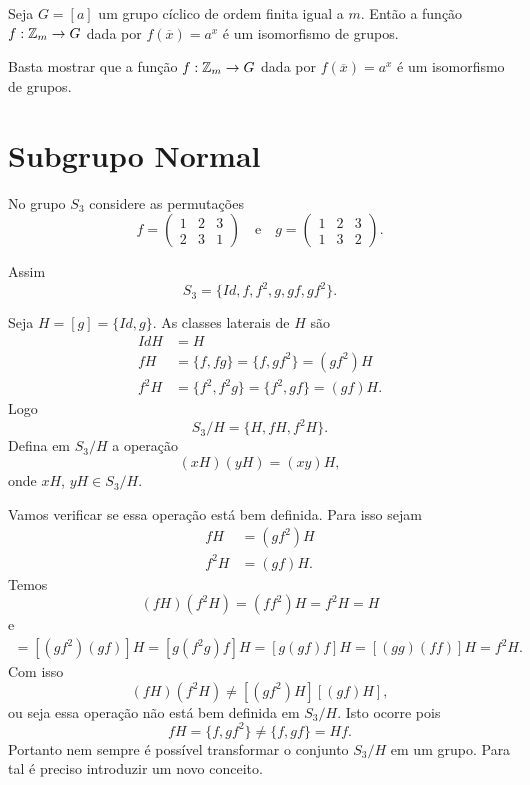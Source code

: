 \begin{corolario}
    Seja $G = [a]$ um grupo cíclico de ordem finita igual a $m$. Então a função $f : \mathbb{Z}_m \to G$ dada por $f(\overline{x}) = a^x$ é um isomorfismo de grupos.
\end{corolario}
\begin{prova}
    Basta mostrar que a função $f : \mathbb{Z}_m \to G$ dada por $f(\overline{x}) = a^x$ é um isomorfismo de grupos.
\end{prova}

\section{Subgrupo Normal} %
\label{sec:subgrupo_normal}

No grupo $S_3$ considere as permutações
\[
    f = \begin{pmatrix}
        1 & 2 & 3\\
        2 & 3 & 1
    \end{pmatrix} \quad \mbox{e}\quad
    g = \begin{pmatrix}
        1 & 2 & 3\\
        1 & 3 & 2
    \end{pmatrix}.
\]

Assim
\[
    S_3 = \{Id, f, f^2, g, gf, gf^2\}.
\]

Seja $H = [g] = \{Id, g\}$. As classes laterais de $H$ são
\begin{align*}
    IdH &= H\\
    fH &= \{f, fg\} = \{f, gf^2\} = (gf^2)H\\
    f^2H &= \{f^2, f^2g\} = \{f^2, gf\} = (gf)H.
\end{align*}
Logo
\[
    S_3/H = \{H, fH, f^2H\}.
\]
Defina em $S_3/H$ a operação
\[
    (xH)(yH) = (xy)H,
\]
onde $xH$, $yH \in S_3/H$.

Vamos verificar se essa operação está bem definida. Para isso sejam
\begin{align*}
    fH &= (gf^2)H\\
    f^2H &= (gf)H.
\end{align*}
Temos
\[
    (fH)(f^2H) = (ff^2)H = f^2H = H
\]
e
\begin{align*}
    [(gf^2)H][(gf)H] = [(gf^2)(gf)]H = [g(f^2g)f]H = [g(gf)f]H = [(gg)(ff)]H = f^2H.
\end{align*}
Com isso
\[
    (fH)(f^2H) \ne [(gf^2)H][(gf)H],
\]
ou seja essa operação não está bem definida em $S_3/H$. Isto ocorre pois
\[
    fH = \{f, gf^2\} \ne \{f, gf\} = Hf.
\]
Portanto nem sempre é possível transformar o conjunto $S_3/H$ em um grupo. Para tal é preciso introduzir um novo conceito.

